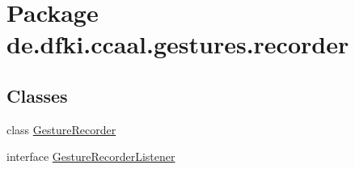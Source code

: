\hypertarget{namespacede_1_1dfki_1_1ccaal_1_1gestures_1_1recorder}{\section{Package de.\-dfki.\-ccaal.\-gestures.\-recorder}
\label{namespacede_1_1dfki_1_1ccaal_1_1gestures_1_1recorder}
}
\subsection*{Classes}
\begin{DoxyCompactItemize}
\item 
class \hyperlink{classde_1_1dfki_1_1ccaal_1_1gestures_1_1recorder_1_1_gesture_recorder}{Gesture\-Recorder}
\item 
interface \hyperlink{interfacede_1_1dfki_1_1ccaal_1_1gestures_1_1recorder_1_1_gesture_recorder_listener}{Gesture\-Recorder\-Listener}
\end{DoxyCompactItemize}
